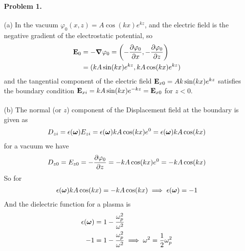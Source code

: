 \documentclass[../main.tex]{subfiles}
\begin{document}
\pagestyle{fancy}

\renewcommand\thefigure{\arabic{figure}} 
\paragraph*{Problem 1.} (a)  In the vacuum $\varphi_0 (x,z) = A \cos(kx) e^{kz}$, and the electric 
field is the negative gradient of the electrostatic potential, so
\begin{align*}
    \vb E_0 &= -\grad \varphi_0 = \qt(-\pdv{\varphi_0}{x}, - \pdv{\varphi_0}{z})\\
    &= (k A \sin(kx) e^{kz}, k A \cos(kx) e^{kz})
\end{align*}
and the tangential component of the electric field $\vb E_{x0} = A k \sin(kx) e^{kz}$ satisfies the
boundary condition $\vb E_{xi} = k A \sin(kx) e^{-kz} = \vb E_{x0}$ for $z < 0$. 
\paragraph*{} (b) The normal (or $z$) component of the Displacement field at the boundary is
given as
\begin{align*}
    D_{zi} = \epsilon(\vb*\omega) E_{zi} = \epsilon(\vb*\omega) k A \cos(kx) e^{0} 
    = \epsilon(\vb*\omega) k A \cos(kx)
\end{align*}
for a vacuum we have
\begin{align*}
    D_{z0} = E_{z0} = -\pdv{\varphi_0}{z} = -k A \cos(kx) e^{0} = -k A \cos(kx)
\end{align*}
So for
\begin{align*}
    \epsilon(\vb*\omega) k A \cos(kx) = -k A \cos(kx) \implies \epsilon(\vb*\omega) = -1
\end{align*}
And the dielectric function for a plasma is
\begin{align*}
    \epsilon(\vb* \omega) &= 1 - \frac{\omega_p^2}{\omega^2} \\
    -1 &= 1 - \frac{\omega_p^2}{\omega^2} \implies \omega^2 = \frac{1}{2} \omega_p^2
\end{align*}
\end{document}

